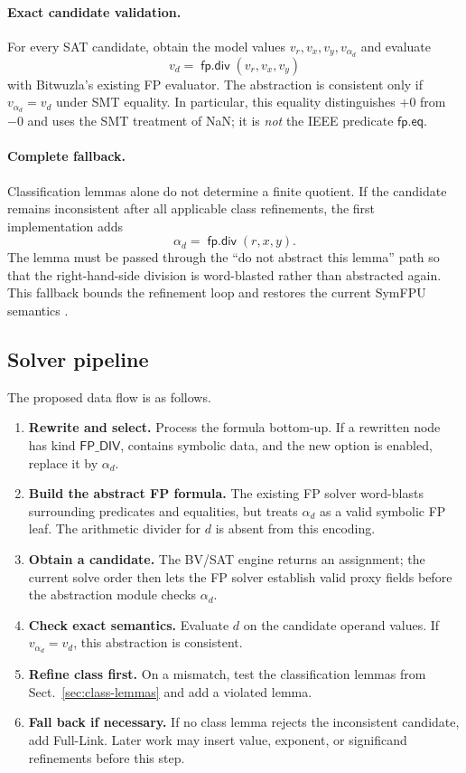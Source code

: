 \documentclass[runningheads]{llncs}
\newcommand{\fpdiv}{\mathop{\mathsf{fp.div}}}
\newcommand{\proxy}{\alpha_d}
\begin{document}
\paragraph{Exact candidate validation.}
For every SAT candidate, obtain the model values
\(v_r,v_x,v_y,v_{\proxy}\) and evaluate
\[
  v_d = \fpdiv(v_r,v_x,v_y)
\]
with Bitwuzla's existing FP evaluator.  The abstraction is consistent only if
\(v_{\proxy}=v_d\) under SMT equality.  In particular, this equality
distinguishes \(+0\) from \(-0\) and uses the SMT treatment of NaN; it is
\emph{not} the IEEE predicate \(\mathsf{fp.eq}\).

\paragraph{Complete fallback.}
Classification lemmas alone do not determine a finite quotient.  If the
candidate remains inconsistent after all applicable class refinements, the
first implementation adds
\[
  \proxy = \fpdiv(r,x,y).
  \tag{Full-Link}
\]
The lemma must be passed through the ``do not abstract this lemma'' path so
that the right-hand-side division is word-blasted rather than abstracted
again.  This fallback bounds the refinement loop and restores the current
SymFPU semantics \cite{symfpu}.

\subsection{Solver pipeline}

The proposed data flow is as follows.

\begin{enumerate}
  \item \textbf{Rewrite and select.}  Process the formula bottom-up.  If a
        rewritten node has kind \(\mathsf{FP\_DIV}\), contains symbolic data,
        and the new option is enabled, replace it by \(\proxy\).
  \item \textbf{Build the abstract FP formula.}  The existing FP solver
        word-blasts surrounding predicates and equalities, but treats
        \(\proxy\) as a valid symbolic FP leaf.  The arithmetic divider for
        \(d\) is absent from this encoding.
  \item \textbf{Obtain a candidate.}  The BV/SAT engine returns an assignment;
        the current solve order then lets the FP solver establish valid proxy
        fields before the abstraction module checks \(\proxy\).
  \item \textbf{Check exact semantics.}  Evaluate \(d\) on the candidate
        operand values.  If \(v_{\proxy}=v_d\), this abstraction is consistent.
  \item \textbf{Refine class first.}  On a mismatch, test the classification
        lemmas from Sect.~\ref{sec:class-lemmas} and add a violated lemma.
  \item \textbf{Fall back if necessary.}  If no class lemma rejects the
        inconsistent candidate, add Full-Link.  Later work may insert value,
        exponent, or significand refinements before this step.
\end{enumerate}
\end{document}
